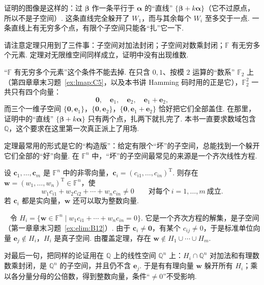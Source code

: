 \documentclass[lang=cn,10.5pt,scheme=chinese,toc=twocol,section,chinesefont=nofont,
twoside,citestyle=gb7714-2015,bibstyle=gb7714-2015]{elegantbook}
\DeclareRobustCommand{\textbf}[1]{{\lnsemiboldlatin\lnsemiboldcjk #1}}
\newcommand{\vv}[1]{\boldsymbol{#1}}
\newcommand{\zero}{\boldsymbol{0}}          %
\newcommand{\trans}{\mathrm{T}}             %
\numberwithin{equation}{section}   %
\newcommand*{\lnlabel}[1]{{\sffamily\bfseries\color{black}#1}}
\renewenvironment{proof}{%
	\par\noindent\lnlabel{\proofname}\;\ \color{black!90}\cfs}{\par}
\begin{document}
\begin{motivebox}
  证明的图像是这样的：过 $\vv\beta$ 作一条平行于 $\vv\alpha$ 的“直线” $\{\vv\beta+k\vv\alpha\}$（它不过原点，所以不是子空间）. 这条直线完全躲开了 $W_1$，而与其余每个 $W_i$ 至多交于一点. 一条直线上有无穷多个点，有限个子空间只能各“扎”它一下.

  请注意定理只用到了三件事：子空间对加法封闭；子空间对数乘封闭；$\mathbb{F}$ 有无穷多个元素. 定理对无限维空间同样成立，证明中没有出现维数.
\end{motivebox}

\begin{pitfallbox}
  “$\mathbb{F}$ 有无穷多个元素”这个条件\textbf{不能去掉}. 在只含 $0,1$、按模 $2$ 运算的“数系” $\mathbb{F}_2$ 上（第四章章末习题~\ref{ex:lmap:C5}，以及本书讲 Hamming 码时用的正是它），$\mathbb{F}_2^2$ 一共只有四个向量：
  \[\zero,\quad\vv e_1,\quad\vv e_2,\quad\vv e_1+\vv e_2,\]
  而三个一维子空间 $\{\zero,\vv e_1\}$，$\{\zero,\vv e_2\}$，$\{\zero,\vv e_1+\vv e_2\}$ 恰好把它们全部盖住. 在那里，证明中的“直线” $\{\vv\beta+k\vv\alpha\}$ 只有两个点，扎两下就扎完了. 本书一直要求数域包含 $\mathbb{Q}$，这个要求在这里第一次真正派上了用场.
\end{pitfallbox}

定理最常用的形式是它的“构造版”：给定有限个“坏”的子空间，总能找到一个躲开它们全部的“好”向量. 在 $\mathbb{F}^n$ 中，“坏”的子空间最常见的来源是一个齐次线性方程.

\begin{corollary}
  \label{cor:avoid}
  设 $\vv c_1,\ldots,\vv c_m$ 是 $\mathbb{F}^n$ 中的非零向量，$\vv c_i=(c_{i1},\ldots,c_{in})^\trans$. 则存在 $\vv w=(w_1,\ldots,w_n)^\trans\in\mathbb{F}^n$，使
  \[w_1c_{i1}+w_2c_{i2}+\cdots+w_nc_{in}\ne0\qquad\text{对每个}\ i=1,\ldots,m\ \text{成立}.\]
  若 $\vv c_i$ 都是实向量，$\vv w$ 还可以取为整数向量.
\end{corollary}
\begin{proof}
  令 $H_i=\{\vv w\in\mathbb{F}^n\mid w_1c_{i1}+\cdots+w_nc_{in}=0\}$. 它是一个齐次方程的解集，是子空间（第一章章末习题~\ref{ex:elim:B12}）. 由于 $\vv c_i\ne\zero$，有某个 $c_{ij}\ne0$，于是标准单位向量 $\vv e_j\notin H_i$，$H_i$ 是真子空间. 由覆盖定理，存在 $\vv w\notin H_1\cup\cdots\cup H_m$.

  对最后一句，把同样的论证用在 $\mathbb{Q}$ 上的线性空间 $\mathbb{Q}^n$ 上：$H_i\cap\mathbb{Q}^n$ 对加法和有理数数乘封闭，是 $\mathbb{Q}^n$ 的子空间，并且仍不含 $\vv e_j$. 于是有有理向量 $\vv w$ 躲开所有 $H_i$；乘以各分量分母的公倍数，得到整数向量，条件“$\ne0$”不受影响.
\end{proof}
\end{document}
